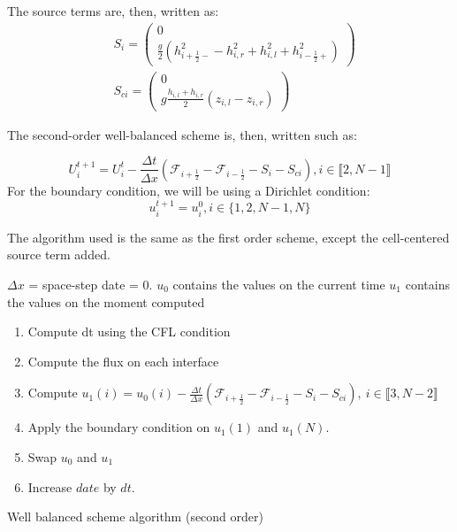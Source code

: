         The source terms are, then, written as:
        \begin{align*}
            &S_i = \begin{pmatrix} 0 \\ \frac{g}{2} \left(  h^2_{i+\frac{1}{2}-} - h^2_{i,r} + h^2_{i,l} + h^2_{i-\frac{1}{2}+} \right)\end{pmatrix} \\
            &S_{ci} = \begin{pmatrix}  0 \\ g\frac{h_{i,l} + h_{i,r}}{2}(z_{i,l} - z_{i,r})  \end{pmatrix}
        \end{align*}
        
        The second-order well-balanced scheme is, then, written such as:
        
        \begin{equation}
            U_i^{t+1} = U_i^t - \frac{\Delta t}{\Delta x}(\mathcal{F}_{i+\frac{1}{2}} - \mathcal{F}_{i-\frac{1}{2}} - S_i - S_{ci}),i\in\llbracket2,N-1\rrbracket
        \end{equation}
         For the boundary condition, we will be using a Dirichlet condition:
        \begin{equation*}
             u^{t+1}_i= u_i^0, i \in\{1,2,N-1,N\}
        \end{equation*}
        
        The algorithm used is the same as the first order scheme, except the cell-centered source term added.

         \begin{algorithm}[h]
            $\Delta x$ = space-step\;
            date = 0.
            $u_0$ contains the values on the current time
            $u_1$ contains the values on the moment computed
            
            {
                 \begin{enumerate}
                     \item Compute dt using the CFL condition
                     \item Compute the flux on each interface
                     \item Compute $u_1(i)=u_0(i) - \frac{\Delta t}{\Delta x}(\mathcal{F}_{i+\frac{1}{2}} - \mathcal{F}_{i-\frac{1}{2} }-S_i - S_{ci}),~ i\in \llbracket 3,N-2 \rrbracket$
                     \item Apply the boundary condition on $u_1\left(1\right)$ and $u_1\left(N\right)$.
                     \item Swap $ u_0$ and $u_1$
                     \item Increase $date$ by $dt$.
                 \end{enumerate}
            }
        \caption{Well balanced scheme algorithm (second order)}
        \end{algorithm}

